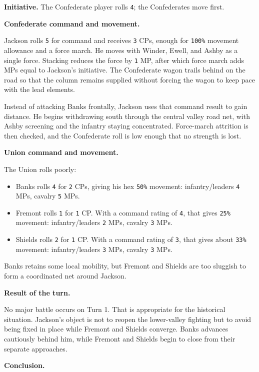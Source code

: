 \documentclass[11pt]{article}
\begin{document}
\textbf{Initiative.} The Confederate player rolls \texttt{4}; the Confederates move first.

\textbf{Confederate command and movement.}

Jackson rolls \texttt{5} for command and receives \texttt{3} CPs, enough for \texttt{100\%} movement allowance and a force march. He moves with Winder, Ewell, and Ashby as a single force. Stacking reduces the force by \texttt{1} MP, after which force march adds MPs equal to Jackson's initiative. The Confederate wagon trails behind on the road so that the column remains supplied without forcing the wagon to keep pace with the lead elements.

Instead of attacking Banks frontally, Jackson uses that command result to gain distance. He begins withdrawing south through the central valley road net, with Ashby screening and the infantry staying concentrated. Force-march attrition is then checked, and the Confederate roll is low enough that no strength is lost.

\textbf{Union command and movement.}

The Union rolls poorly:

\begin{itemize}
\item Banks rolls \texttt{4} for \texttt{2} CPs, giving his hex \texttt{50\%} movement: infantry/leaders \texttt{4} MPs, cavalry \texttt{5} MPs.
\item Fremont rolls \texttt{1} for \texttt{1} CP. With a command rating of \texttt{4}, that gives \texttt{25\%} movement: infantry/leaders \texttt{2} MPs, cavalry \texttt{3} MPs.
\item Shields rolls \texttt{2} for \texttt{1} CP. With a command rating of \texttt{3}, that gives about \texttt{33\%} movement: infantry/leaders \texttt{3} MPs, cavalry \texttt{3} MPs.
\end{itemize}

Banks retains some local mobility, but Fremont and Shields are too sluggish to form a coordinated net around Jackson.

\textbf{Result of the turn.}

No major battle occurs on Turn 1. That is appropriate for the historical situation. Jackson's object is not to reopen the lower-valley fighting but to avoid being fixed in place while Fremont and Shields converge. Banks advances cautiously behind him, while Fremont and Shields begin to close from their separate approaches.

\textbf{Conclusion.}
\end{document}

